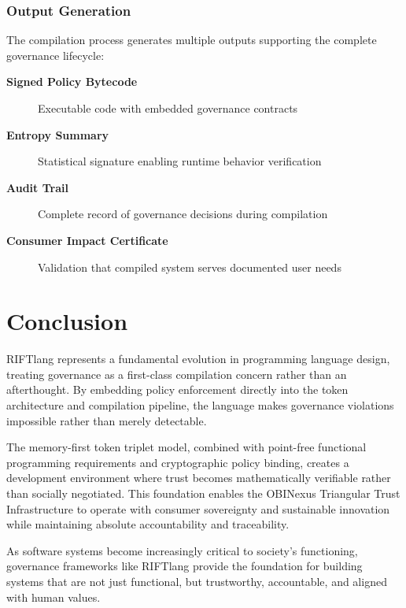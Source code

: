 \subsection{Output Generation}

The compilation process generates multiple outputs supporting the complete governance lifecycle:

\begin{description}
\item[\textbf{Signed Policy Bytecode}] Executable code with embedded governance contracts
\item[\textbf{Entropy Summary}] Statistical signature enabling runtime behavior verification
\item[\textbf{Audit Trail}] Complete record of governance decisions during compilation
\item[\textbf{Consumer Impact Certificate}] Validation that compiled system serves documented user needs
\end{description}

\chapter*{Conclusion}

RIFTlang represents a fundamental evolution in programming language design, treating governance as a first-class compilation concern rather than an afterthought. By embedding policy enforcement directly into the token architecture and compilation pipeline, the language makes governance violations impossible rather than merely detectable.

The memory-first token triplet model, combined with point-free functional programming requirements and cryptographic policy binding, creates a development environment where trust becomes mathematically verifiable rather than socially negotiated. This foundation enables the OBINexus Triangular Trust Infrastructure to operate with consumer sovereignty and sustainable innovation while maintaining absolute accountability and traceability.

As software systems become increasingly critical to society's functioning, governance frameworks like RIFTlang provide the foundation for building systems that are not just functional, but trustworthy, accountable, and aligned with human values.

